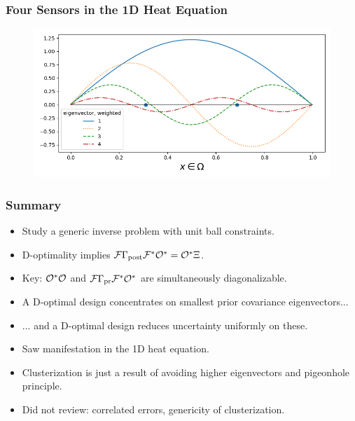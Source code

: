 \documentclass{beamer}
\begin{document}
\begin{frame}
  \frametitle{Four Sensors in the 1D Heat Equation}
  \begin{figure}
    \centering
    \includegraphics[width=\textwidth]{eigenvectors_dst.png}
  \end{figure}
\end{frame}

\begin{frame}
  \frametitle{Summary}
  \begin{itemize}
  \item Study a generic inverse problem with unit ball constraints.
  \item D-optimality implies \(\mathcal{F} \Gamma_{\textup{post}}\mathcal{F}^* \mathcal{O}^* = \mathcal{O}^* \Xi\).
  \item Key: $\mathcal{O}^*\mathcal{O}$ and \(\mathcal{F} \Gamma_{\textup{pr}}\mathcal{F}^* \mathcal{O}^*\) are
    simultaneously diagonalizable.
  \item A D-optimal design concentrates on smallest prior covariance eigenvectors...
  \item ... and a D-optimal design reduces uncertainty uniformly on these.
  \item Saw manifestation in the 1D heat equation.
  \item Clusterization is just a result of avoiding higher eigenvectors
    and pigeonhole principle.
  \item Did not review: correlated errors, genericity of clusterization.
  \end{itemize}
\end{frame}
\end{document}
